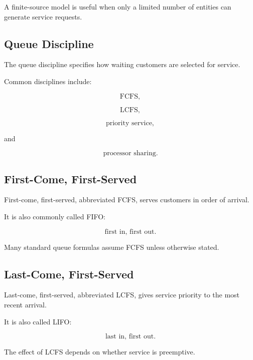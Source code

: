 A finite-source model is useful when only a limited number of entities can
generate service requests.

\subsection{Queue Discipline}
\label{subsec:queue-discipline}

The queue discipline specifies how waiting customers are selected for
service.

Common disciplines include:

\[
\boxed{
\text{FCFS},
}
\]

\[
\boxed{
\text{LCFS},
}
\]

\[
\boxed{
\text{priority service},
}
\]

and

\[
\boxed{
\text{processor sharing}.
}
\]

\subsection{First-Come, First-Served}
\label{subsec:fcfs}

First-come, first-served, abbreviated FCFS, serves customers in order of
arrival.

It is also commonly called FIFO:

\[
\boxed{
\text{first in, first out}.
}
\]

Many standard queue formulas assume FCFS unless otherwise stated.

\subsection{Last-Come, First-Served}
\label{subsec:lcfs}

Last-come, first-served, abbreviated LCFS, gives service priority to the
most recent arrival.

It is also called LIFO:

\[
\boxed{
\text{last in, first out}.
}
\]

The effect of LCFS depends on whether service is preemptive.

